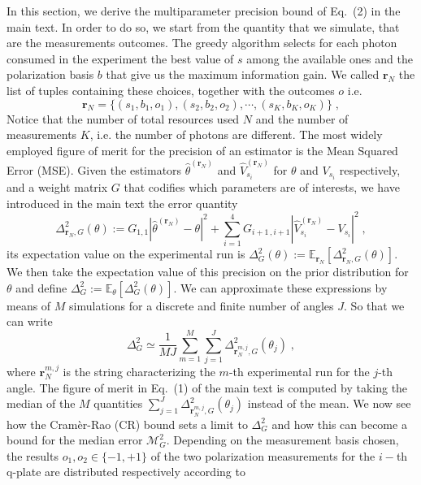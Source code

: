 \documentclass[superscriptaddress,notitlepage,pra]{revtex4-1}
\begin{document}
In this section, we derive the multiparameter precision bound of Eq.~(2) in the main text. In order to do so, we 
start from the quantity that we simulate, that are the measurements outcomes. The greedy algorithm selects for each photon consumed in the experiment the best value of $s$ among the available ones and the polarization basis $b$ that give us the maximum information gain. We called $\boldsymbol{r}_N$ the list of tuples containing these choices, together with the outcomes $o$ i.e.
%
\begin{equation}
    \boldsymbol{r}_N = \lbrace (s_1, b_1, o_1), (s_2, b_2, o_2), \cdots, (s_K, b_K, o_K) \rbrace \; ,
\end{equation}
%
Notice that the number of total resources used $N$ and the number of measurements $K$, i.e. the number of photons are different. The most widely employed figure of merit for the precision of an estimator is the Mean Squared Error (MSE). Given the estimators $\hat{\theta}^{(\boldsymbol{r}_N)}$ and $\hat{V}^{(\boldsymbol{r}_N)}_{s_i}$ for $\theta$ and $V_{s_i}$ respectively, and a weight matrix $G$ that codifies which parameters are of interests, we have introduced in the main text the error quantity
%
\begin{equation}
    \Delta^2_{\boldsymbol{r}_N, G} (\theta) := G_{1,1}|\hat{\theta}^{({\mathbf r}_N)}-\theta|^2 + \sum_{i=1}^4 G_{i+1\, , i+1} |\hat{V}^{({\mathbf r}_N)}_{s_i}-V_{s_i}|^2 \; ,
\end{equation}
%
its expectation value on the experimental run is $\Delta^2_G (\theta) := \mathbb{E}_{\boldsymbol{r}_N} [\Delta^2_{\boldsymbol{r}_N, G} (\theta)]$. We then take the expectation value of this precision on the prior distribution for $\theta$ and define $\Delta^2_G := \mathbb{E}_{\theta} [\Delta^2_{G} (\theta)]$. We can approximate these expressions by means of $M$ simulations for a discrete and finite number of angles $J$. So that we can write
%
\begin{equation}
    \Delta^2_G \simeq \frac{1}{MJ} \sum_{m=1}^{M} \sum_{j=1}^J \Delta^2_{\boldsymbol{r}_N^{m, j}, G} (\theta_j) \; , 
\end{equation}
%
where ${\boldsymbol{r}_N^{m, j}}$ is the string characterizing the $m$-th experimental run for the $j$-th angle. The figure of merit in Eq.~(1) of the main text is computed by taking the median of the $M$ quantities $\sum_{j=1}^J \Delta^2_{\boldsymbol{r}_N^{m, j}, G} (\theta_j)$ instead of the mean. We now see how the Cramèr-Rao (CR) bound sets a limit to $\Delta^2_G$ and how this can become a bound for the median error $\mathcal{M}_G^2$. Depending on the measurement basis chosen, the results $o_1, o_2 \in \lbrace -1, +1 \rbrace$ of the two polarization measurements for the $i-$th q-plate are distributed respectively according to 
\end{document}
